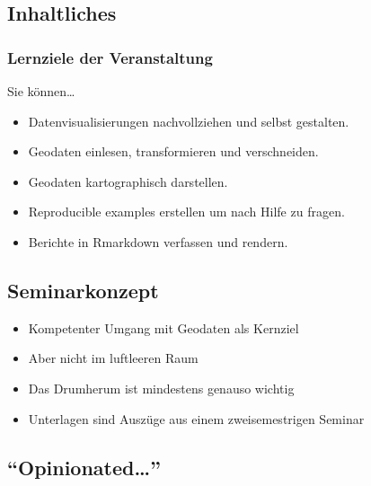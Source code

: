 \documentclass[
  ngerman,
]{article}
\providecommand{\tightlist}{%
  \setlength{\itemsep}{0pt}\setlength{\parskip}{0pt}}
\begin{document}
\hypertarget{inhaltliches}{%
\subsection{Inhaltliches}\label{inhaltliches}}

\hypertarget{lernziele-der-veranstaltung}{%
\subsubsection{Lernziele der Veranstaltung}\label{lernziele-der-veranstaltung}}

Sie können\ldots{}

\begin{itemize}
\tightlist
\item
  Datenvisualisierungen nachvollziehen und selbst gestalten.
\item
  Geodaten einlesen, transformieren und verschneiden.
\item
  Geodaten kartographisch darstellen.
\item
  Reproducible examples erstellen um nach Hilfe zu fragen.
\item
  Berichte in Rmarkdown verfassen und rendern.
\end{itemize}

\hypertarget{seminarkonzept}{%
\subsection{Seminarkonzept}\label{seminarkonzept}}

\begin{itemize}
\tightlist
\item
  Kompetenter Umgang mit Geodaten als Kernziel
\item
  Aber nicht im luftleeren Raum
\item
  Das Drumherum ist mindestens genauso wichtig
\item
  Unterlagen sind Auszüge aus einem zweisemestrigen Seminar
\end{itemize}

\hypertarget{opinionated}{%
\subsection{\texorpdfstring{``Opinionated\ldots{}''}{``Opinionated\ldots''}}\label{opinionated}}
\end{document}
